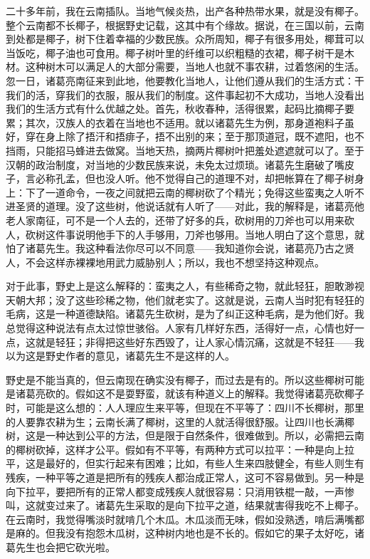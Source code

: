 二十多年前，我在云南插队。当地气候炎热，出产各种热带水果，就是没有椰子。整个云南都不长椰子，根据野史记载，这其中有个缘故。据说，在三国以前，云南到处都是椰子，树下住着幸福的少数民族。众所周知，椰子有很多用处，椰茸可以当饭吃，椰子油也可食用。椰子树叶里的纤维可以织粗糙的衣裙，椰子树干是木材。这种树木可以满足人的大部分需要，当地人也就不事农耕，过着悠闲的生活。忽一日，诸葛亮南征来到此地，他要教化当地人，让他们遵从我们的生活方式：干我们的活，穿我们的衣服，服从我们的制度。这件事起初不大成功，当地人没看出我们的生活方式有什么优越之处。首先，秋收春种，活得很累，起码比摘椰子要累；其次，汉族人的衣着在当地也不适用。就以诸葛先生为例，那身道袍料子虽好，穿在身上除了捂汗和捂痱子，捂不出别的来；至于那顶道冠，既不遮阳，也不挡雨，只能招马蜂进去做窝。当地天热，摘两片椰树叶把羞处遮遮就可以了。至于汉朝的政治制度，对当地的少数民族来说，未免太过烦琐。诸葛先生磨破了嘴皮子，言必称孔孟，但也没人听。他不觉得自己的道理不对，却把帐算在了椰子树身上：下了一道命令，一夜之间就把云南的椰树砍了个精光；免得这些蛮夷之人听不进圣贤的道理。没了这些树，他说话就有人听了——对此，我的解释是，诸葛亮他老人家南征，可不是一个人去的，还带了好多的兵，砍树用的刀斧也可以用来砍人，砍树这件事说明他手下的人手够用，刀斧也够用。当地人明白了这个意思，就怕了诸葛先生。我这种看法你尽可以不同意——我知道你会说，诸葛亮乃古之贤人，不会这样赤裸裸地用武力威胁别人；所以，我也不想坚持这种观点。 

对于此事，野史上是这么解释的：蛮夷之人，有些稀奇之物，就此轻狂，胆敢渺视天朝大邦；没了这些珍稀之物，他们就老实了。这就是说，云南人当时犯有轻狂的毛病，这是一种道德缺陷。诸葛先生砍树，是为了纠正这种毛病，是为他们好。我总觉得这种说法有点太过惊世骇俗。人家有几样好东西，活得好一点，心情也好一点，这就是轻狂；非得把这些好东西毁了，让人家心情沉痛，这就是不轻狂——我以为这是野史作者的意见，诸葛先生不是这样的人。 

野史是不能当真的，但云南现在确实没有椰子，而过去是有的。所以这些椰树可能是诸葛亮砍的。假如这不是耍野蛮，就该有种道义上的解释。我觉得诸葛亮砍椰子时，可能是这么想的：人人理应生来平等，但现在不平等了：四川不长椰树，那里的人要靠农耕为生；云南长满了椰树，这里的人就活得很舒服。让四川也长满椰树，这是一种达到公平的方法，但是限于自然条件，很难做到。所以，必需把云南的椰树砍掉，这样才公平。假如有不平等，有两种方式可以拉平：一种是向上拉平，这是最好的，但实行起来有困难；比如，有些人生来四肢健全，有些人则生有残疾，一种平等之道是把所有的残疾人都治成正常人，这可不容易做到。另一种是向下拉平，要把所有的正常人都变成残疾人就很容易：只消用铁棍一敲，一声惨叫，这就变过来了。诸葛先生采取的是向下拉平之道，结果就害得我吃不上椰子。在云南时，我觉得嘴淡时就啃几个木瓜。木瓜淡而无味，假如没熟透，啃后满嘴都是麻的。但我没有抱怨木瓜树，这种树内地也是不长的。假如它的果子太好吃，诸葛先生也会把它砍光啦。 

